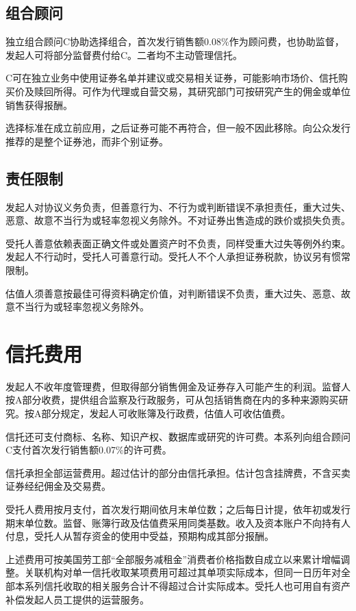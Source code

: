 \documentclass[UTF8,fontset=none,11pt,a4paper]{ctexart}
\begin{document}
\subsection*{组合顾问}
独立组合顾问C协助选择组合，首次发行销售额0.08\%作为顾问费，也协助监督，发起人可将部分监督费付给C。二者均不主动管理信托。


C可在独立业务中使用证券名单并建议或交易相关证券，可能影响市场价、信托购买价及赎回所得。可作为代理或自营交易，其研究部门可按研究产生的佣金或单位销售获得报酬。


选择标准在成立前应用，之后证券可能不再符合，但一般不因此移除。向公众发行推荐的是整个证券池，而非个别证券。


\subsection*{责任限制}
发起人对协议义务负责，但善意行为、不行为或判断错误不承担责任，重大过失、恶意、故意不当行为或轻率忽视义务除外。不对证券出售造成的跌价或损失负责。


受托人善意依赖表面正确文件或处置资产时不负责，同样受重大过失等例外约束。发起人不行动时，受托人可善意行动。受托人不个人承担证券税款，协议另有惯常限制。


估值人须善意按最佳可得资料确定价值，对判断错误不负责，重大过失、恶意、故意不当行为或轻率忽视义务除外。


\section*{信托费用}
发起人不收年度管理费，但取得部分销售佣金及证券存入可能产生的利润。监督人按A部分收费，提供组合监察及行政服务，可从包括销售商在内的多种来源购买研究。按A部分规定，发起人可收账簿及行政费，估值人可收估值费。


信托还可支付商标、名称、知识产权、数据库或研究的许可费。本系列向组合顾问C支付首次发行销售额0.07\%的许可费。


信托承担全部运营费用。超过估计的部分由信托承担。估计包含挂牌费，不含买卖证券经纪佣金及交易费。


受托人费用按月支付，首次发行期间依月末单位数；之后每日计提，依年初或发行期末单位数。监督、账簿行政及估值费采用同类基数。收入及资本账户不向持有人付息，受托人从暂存资金的使用中受益，预期构成其部分报酬。


上述费用可按美国劳工部“全部服务减租金”消费者价格指数自成立以来累计增幅调整。关联机构对单一信托收取某项费用可超过其单项实际成本，但同一日历年对全部本系列信托收取的相关服务合计不得超过合计实际成本。受托人也可用自有资产补偿发起人员工提供的运营服务。
\end{document}
